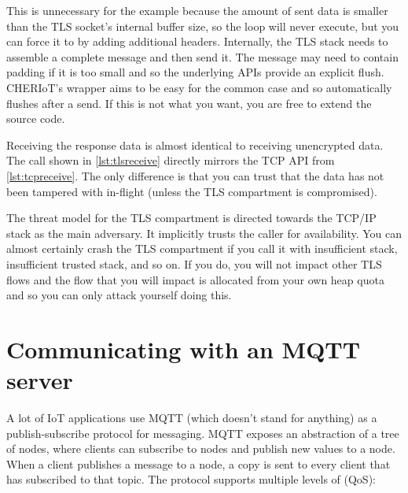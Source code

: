 This is unnecessary for the example because the amount of sent data is smaller than the TLS socket's internal buffer size, so the loop will never execute, but you can force it to by adding additional headers.
Internally, the TLS stack needs to assemble a complete message and then send it.
The message may need to contain padding if it is too small and so the underlying APIs provide an explicit flush.
CHERIoT's wrapper aims to be easy for the common case and so automatically flushes after a send.
If this is not what you want, you are free to extend the source code.

\codelisting[filename=examples/tls/https.cc,marker=send,label=lst:tlssend,caption="Sending data over a TLS connection."]{}

Receiving the response data is almost identical to receiving unencrypted data.
The call shown in \ref{lst:tlsreceive} directly mirrors the TCP API from \ref{lst:tcpreceive}.
The only difference is that you can trust that the data has not been tampered with in-flight (unless the TLS compartment is compromised).

\codelisting[filename=examples/tls/https.cc,marker=receive,label=lst:tlsreceive,caption="Receiving data over a TLS connection."]{}

\begin{caution}
The threat model for the TLS compartment is directed towards the TCP/IP stack as the main adversary.
It implicitly trusts the caller for availability.
You can almost certainly crash the TLS compartment if you call it with insufficient stack, insufficient trusted stack, and so on.
If you do, you will not impact other TLS flows and the flow that you will impact is allocated from your own heap quota and so you can only attack yourself doing this.
\end{caution}

\section[label=mqtt]{Communicating with an MQTT server}

A lot of IoT applications use MQTT (which doesn't stand for anything) as a publish-subscribe protocol for messaging.
MQTT exposes an abstraction of a tree of nodes, where clients can subscribe to nodes and publish new values to a node.
When a client publishes a message to a node, a copy is sent to every client that has subscribed to that topic.
The protocol supports multiple levels of  (QoS):

